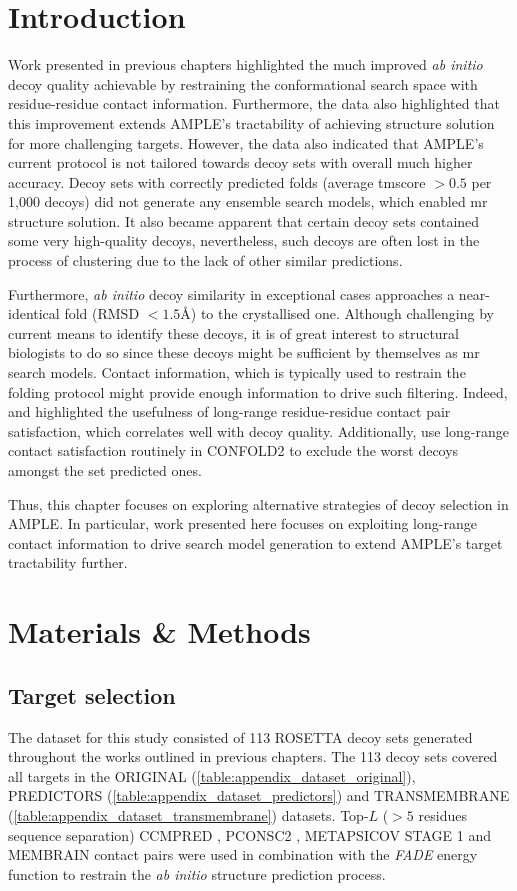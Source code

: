 \section{Introduction}
Work presented in previous chapters highlighted the much improved \textit{ab initio} decoy quality achievable by restraining the conformational search space with residue-residue contact information. Furthermore, the data also highlighted that this improvement extends AMPLE's tractability of achieving structure solution for more challenging targets. However, the data also indicated that AMPLE's current protocol is not tailored towards decoy sets with overall much higher accuracy. Decoy sets with correctly predicted folds (average \gls{tmscore} $>0.5$ per 1,000 decoys) did not generate any ensemble search models, which enabled \gls{mr} structure solution. It also became apparent that certain decoy sets contained some very high-quality decoys, nevertheless, such decoys are often lost in the process of clustering due to the lack of other similar predictions.

Furthermore, \textit{ab initio} decoy similarity in exceptional cases approaches a near-identical fold (RMSD $<1.5$\AA) to the crystallised one. Although challenging by current means to identify these decoys, it is of great interest to structural biologists to do so since these decoys might be sufficient by themselves as \gls{mr} search models. Contact information, which is typically used to restrain the folding protocol might provide enough information to drive such filtering. Indeed, \textcite{Kosciolek2014-bt} and \textcite{De_Oliveira2017-gj} highlighted the usefulness of long-range residue-residue contact pair satisfaction, which correlates well with decoy quality. Additionally, \textcite{Adhikari2018-lj} use long-range contact satisfaction routinely in CONFOLD2 to exclude the worst decoys amongst the set predicted ones.

Thus, this chapter focuses on exploring alternative strategies of decoy selection in AMPLE. In particular, work presented here focuses on exploiting long-range contact information to drive search model generation to extend AMPLE's target tractability further.

\section{Materials \& Methods}
\subsection{Target selection}
The dataset for this study consisted of 113 ROSETTA decoy sets generated throughout the works outlined in previous chapters. The 113 decoy sets covered all targets in the ORIGINAL (\cref{table:appendix_dataset_original}), PREDICTORS (\cref{table:appendix_dataset_predictors}) and TRANSMEMBRANE (\cref{table:appendix_dataset_transmembrane}) datasets. Top-$L$ ($>5$ residues sequence separation) CCMPRED \cite{Seemayer2014-zp}, PCONSC2 \cite{Skwark2014-qp}, METAPSICOV STAGE 1 \cite{Jones2015-vq} and MEMBRAIN \cite{Yang2013-bf} contact pairs were used in combination with the \textit{FADE} energy function to restrain the \textit{ab initio} structure prediction process.


